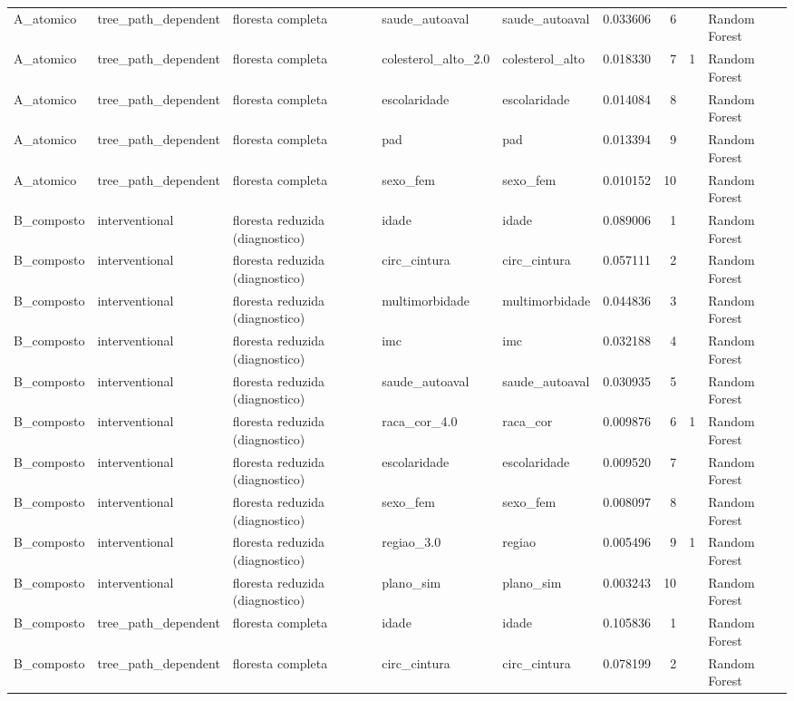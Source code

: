 \begin{tabular}{lllllrrll}
A_atomico & tree_path_dependent & floresta completa & saude_autoaval & saude_autoaval & 0.033606 & 6 &  & Random Forest \\
A_atomico & tree_path_dependent & floresta completa & colesterol_alto_2.0 & colesterol_alto & 0.018330 & 7 & 1 & Random Forest \\
A_atomico & tree_path_dependent & floresta completa & escolaridade & escolaridade & 0.014084 & 8 &  & Random Forest \\
A_atomico & tree_path_dependent & floresta completa & pad & pad & 0.013394 & 9 &  & Random Forest \\
A_atomico & tree_path_dependent & floresta completa & sexo_fem & sexo_fem & 0.010152 & 10 &  & Random Forest \\
B_composto & interventional & floresta reduzida (diagnostico) & idade & idade & 0.089006 & 1 &  & Random Forest \\
B_composto & interventional & floresta reduzida (diagnostico) & circ_cintura & circ_cintura & 0.057111 & 2 &  & Random Forest \\
B_composto & interventional & floresta reduzida (diagnostico) & multimorbidade & multimorbidade & 0.044836 & 3 &  & Random Forest \\
B_composto & interventional & floresta reduzida (diagnostico) & imc & imc & 0.032188 & 4 &  & Random Forest \\
B_composto & interventional & floresta reduzida (diagnostico) & saude_autoaval & saude_autoaval & 0.030935 & 5 &  & Random Forest \\
B_composto & interventional & floresta reduzida (diagnostico) & raca_cor_4.0 & raca_cor & 0.009876 & 6 & 1 & Random Forest \\
B_composto & interventional & floresta reduzida (diagnostico) & escolaridade & escolaridade & 0.009520 & 7 &  & Random Forest \\
B_composto & interventional & floresta reduzida (diagnostico) & sexo_fem & sexo_fem & 0.008097 & 8 &  & Random Forest \\
B_composto & interventional & floresta reduzida (diagnostico) & regiao_3.0 & regiao & 0.005496 & 9 & 1 & Random Forest \\
B_composto & interventional & floresta reduzida (diagnostico) & plano_sim & plano_sim & 0.003243 & 10 &  & Random Forest \\
B_composto & tree_path_dependent & floresta completa & idade & idade & 0.105836 & 1 &  & Random Forest \\
B_composto & tree_path_dependent & floresta completa & circ_cintura & circ_cintura & 0.078199 & 2 &  & Random Forest \\

\end{tabular}
